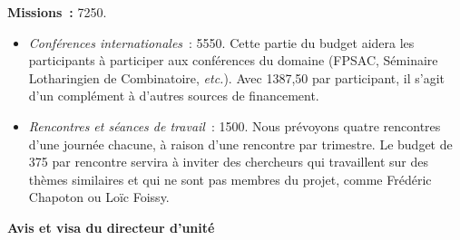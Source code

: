 \documentclass[10pt,reqno]{amsart}
\numberwithin{equation}{subsection}
\begin{document}
{\bf Missions~:} 7250\texteuro.
\begin{itemize}[fullwidth]
    \item {\em Conférences internationales}~: 5550\texteuro.
    Cette partie du budget aidera les participants à participer aux
    conférences du domaine (FPSAC, Séminaire Lotharingien de
    Combinatoire, {\em etc.}). Avec 1387,50\texteuro{} par participant,
    il s'agit d'un complément à d'autres sources de financement.

    \item {\em Rencontres et séances de travail}~: 1500\texteuro.
    Nous prévoyons quatre
    rencontres d'une journée chacune, à raison d'une rencontre par
    trimestre. 
    Le budget
    de 375\texteuro{} par rencontre servira à inviter des chercheurs
    qui travaillent sur des thèmes similaires et qui ne sont pas
    membres du projet, comme Frédéric Chapoton ou Loïc Foissy.
\end{itemize}



\bigskip

\Large{\bf{Avis et visa du directeur d’unité}}
\bigskip
\end{document}
